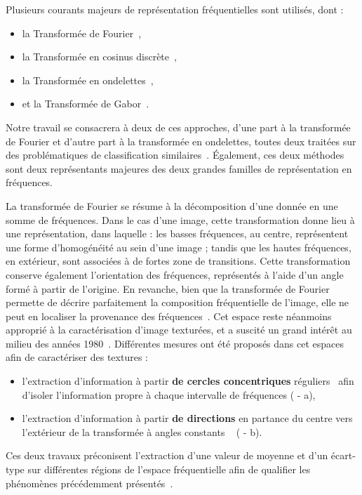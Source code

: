 Plusieurs courants majeurs de représentation fréquentielles sont utilisés, dont : 
\begin{itemize}
    \item la Transformée de Fourier~\cite{Ursani2007, Smach2008a},
    \item la Transformée en cosinus discrète~\cite{Sorwar2001},
    \item la Transformée en ondelettes~\cite{Arivazhagan2003,Hong2010},
    \item et la Transformée de Gabor~\cite{Ursani2007}.
\end{itemize}
Notre travail se consacrera à deux de ces approches, d'une part à la transformée de Fourier et d'autre part à la transformée en ondelettes, toutes deux traitées sur des problématiques de classification similaires~\cite{Wiltgen2008,Halimi2017a,Halimi2017b}. Également, ces deux méthodes sont deux représentants majeures des deux grandes familles de représentation en fréquences.\par

La transformée de Fourier se résume à la décomposition d'une donnée en une somme de fréquences. Dans le cas d'une image, cette transformation donne lieu à une représentation, dans laquelle : les basses fréquences, au centre, représentent une forme d'homogénéité au sein d'une image ; tandis que les hautes fréquences, en extérieur, sont associées à de fortes zone de transitions. Cette transformation conserve également l'orientation des fréquences, représentés à l'aide d'un angle formé à partir de l'origine. En revanche, bien que la transformée de Fourier permette de décrire parfaitement la composition fréquentielle de l'image, elle ne peut en localiser la provenance des fréquences~\cite{Wiltgen2008}. Cet espace reste néanmoins approprié à la caractérisation d'image texturées, et a suscité un grand intérêt au milieu des années 1980~\cite{Persoon1986}. Différentes mesures ont été proposés dans cet espaces afin de caractériser des textures :
\begin{itemize}
    \item l'extraction d'information à partir \textbf{de cercles concentriques} réguliers~\cite{Smach2008a, Wiltgen2008} afin d'isoler l'information propre à chaque intervalle de fréquences ( - a),
    \item l'extraction d'information à partir \textbf{de directions} en partance du centre vers l'extérieur de la transformée à angles constants ~\cite{Wiltgen2008} ( - b).
\end{itemize}
Ces deux travaux préconisent l'extraction d'une valeur de moyenne et d'un écart-type sur différentes régions de l'espace fréquentielle afin de qualifier les phénomènes précédemment présentés~\cite{Smach2008a, Wiltgen2008}. 

